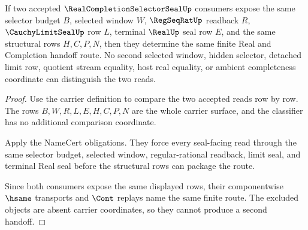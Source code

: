 \begin{theorem}
\label{thm:real-completion-selector-seal-route-determinacy}
If two accepted $\RealCompletionSelectorSealUp$ consumers expose the same selector budget $B$, selected window $W$, $\RegSeqRatUp$ readback $R$, $\CauchyLimitSealUp$ row $L$, terminal $\RealUp$ seal row $E$, and the same structural rows $H,C,P,N$, then they determine the same finite Real and Completion handoff route. No second selected window, hidden selector, detached limit row, quotient stream equality, host real equality, or ambient completeness coordinate can distinguish the two reads.
\end{theorem}
\begin{proof}
Use the carrier definition to compare the two accepted reads row by row. The rows $B,W,R,L,E,H,C,P,N$ are the whole carrier surface, and the classifier has no additional comparison coordinate.

Apply the NameCert obligations. They force every seal-facing read through the same selector budget, selected window, regular-rational readback, limit seal, and terminal Real seal before the structural rows can package the route.

Since both consumers expose the same displayed rows, their componentwise $\hsame$ transports and $\Cont$ replays name the same finite route. The excluded objects are absent carrier coordinates, so they cannot produce a second handoff.
\end{proof}

